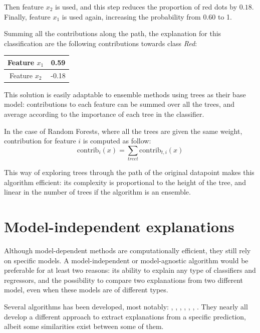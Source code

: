 \documentclass[a4paper,11pt]{kth-mag}
\begin{document}
Then feature $x_2$ is used, and this step reduces the proportion of red dots by $0.18$. Finally, feature $x_1$ is used again, increasing the probability from 0.60 to 1. 

Summing all the contributions along the path, the explanation for this classification are the following contributions towards class \textit{Red}:

\begin{center}
\begin{tabular}{|c|c|}
\hline
Feature $x_1$ & 0.59 \\
\hline
Feature $x_2$ & -0.18 \\
\hline
\end{tabular}
\end{center}

This solution is easily adaptable to ensemble methods using trees as their base model: contributions to each feature can be summed over all the trees, and average according to the importance of each tree in the classifier.

In the case of Random Forests, where all the trees are given the same weight, contribution for feature $i$ is computed as follow:
\[
	\mathrm{contrib}_i(x) = \sum_{tree t} \mathrm{contrib}_{t,i} (x)
\]

This way of exploring trees through the path of the original datapoint makes this algorithm efficient: its complexity is proportional to the height of the tree, and linear in the number of trees if the algorithm is an ensemble.

\section{Model-independent explanations}

Although model-dependent methods are computationally efficient, they still rely on specific models. A model-independent or model-agnostic algorithm would be preferable for at least two reasons: its ability to explain any type of classifiers and regressors, and the possibility to compare two explanations from two different model, even when these models are of different types.

Several algorithms has been developed, most notably: \cite{lime}, \cite{explvect}, \cite{explainingclassif}, \cite{evolutionnary}, \cite{gametheory}, \cite{ice}, \cite{sensitivity}. They nearly all develop a different approach to extract explanations from a specific prediction, albeit some similarities exist between some of them.
\end{document}
